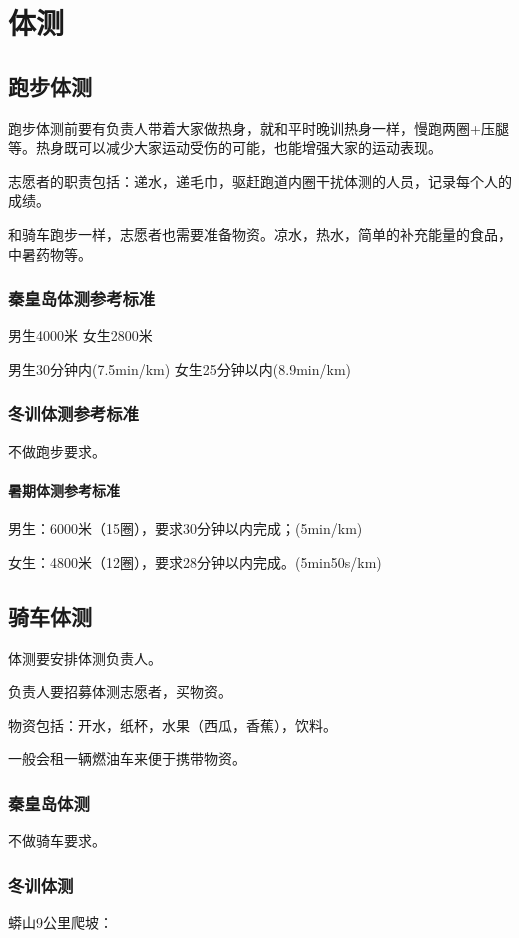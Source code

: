 \documentclass{ctexbook}
\begin{document}
\section{体测}

\subsection{跑步体测}
跑步体测前要有负责人带着大家做热身，就和平时晚训热身一样，慢跑两圈+压腿等。热身既可以减少大家运动受伤的可能，也能增强大家的运动表现。

志愿者的职责包括：递水，递毛巾，驱赶跑道内圈干扰体测的人员，记录每个人的成绩。

和骑车跑步一样，志愿者也需要准备物资。凉水，热水，简单的补充能量的食品，中暑药物等。

\subsubsection{秦皇岛体测参考标准}

男生4000米 女生2800米

男生30分钟内(7.5min/km) 女生25分钟以内(8.9min/km)
\subsubsection{冬训体测参考标准}
不做跑步要求。
\paragraph{暑期体测参考标准}
男生：6000米（15圈），要求30分钟以内完成；(5min/km)

女生：4800米（12圈），要求28分钟以内完成。(5min50s/km)


\subsection{骑车体测}

体测要安排体测负责人。

负责人要招募体测志愿者，买物资。

物资包括：开水，纸杯，水果（西瓜，香蕉），饮料。

一般会租一辆燃油车来便于携带物资。

\subsubsection{秦皇岛体测}
不做骑车要求。
\subsubsection{冬训体测}
蟒山9公里爬坡：
\end{document}
